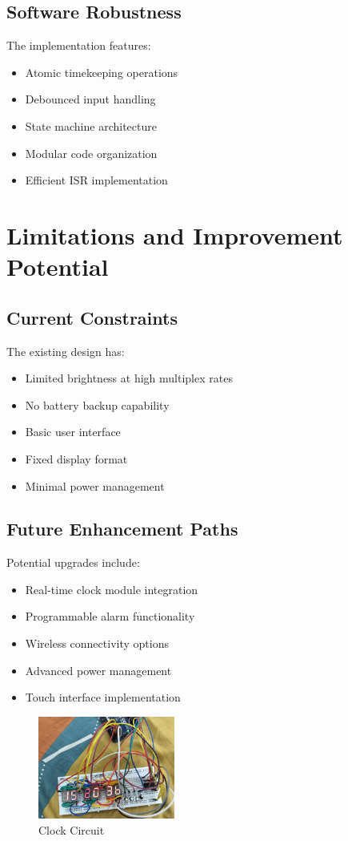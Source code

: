 \documentclass[a4paper,12pt]{article}
\begin{document}
\subsection{Software Robustness}
The implementation features:

\begin{itemize}
    \item Atomic timekeeping operations
    \item Debounced input handling
    \item State machine architecture
    \item Modular code organization
    \item Efficient ISR implementation
\end{itemize}

\section{Limitations and Improvement Potential}

\subsection{Current Constraints}
The existing design has:

\begin{itemize}
    \item Limited brightness at high multiplex rates
    \item No battery backup capability
    \item Basic user interface
    \item Fixed display format
    \item Minimal power management
\end{itemize}

\subsection{Future Enhancement Paths}
Potential upgrades include:

\begin{itemize}
    \item Real-time clock module integration
    \item Programmable alarm functionality
    \item Wireless connectivity options
    \item Advanced power management
    \item Touch interface implementation
\end{itemize}
\begin{figure}[h]
    \centering
    \includegraphics[width=0.4\textwidth]{clock.jpeg}   
    \caption{Clock Circuit}
\end{figure}
\end{document}
